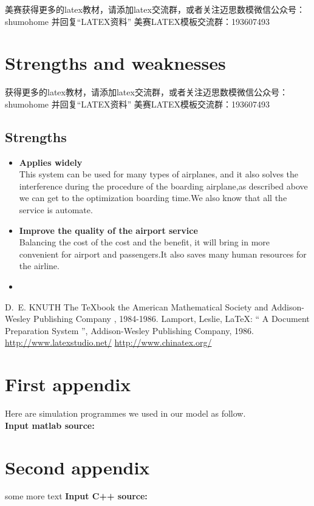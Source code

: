 \documentclass{mcmthesis}
\begin{document}
美赛获得更多的latex教材，请添加latex交流群，或者关注迈思数模微信公众号：shumohome
并回复“LATEX资料”
美赛LATEX模板交流群：193607493
\section{Strengths and weaknesses}

获得更多的latex教材，请添加latex交流群，或者关注迈思数模微信公众号：shumohome
并回复“LATEX资料”
美赛LATEX模板交流群：193607493

\subsection{Strengths}
\begin{itemize}
\item \textbf{Applies widely}\\
This  system can be used for many types of airplanes, and it also
solves the interference during  the procedure of the boarding
airplane,as described above we can get to the  optimization
boarding time.We also know that all the service is automate.
\item \textbf{Improve the quality of the airport service}\\
Balancing the cost of the cost and the benefit, it will bring in
more convenient  for airport and passengers.It also saves many
human resources for the airline. \item \textbf{}
\end{itemize}

\begin{thebibliography}{99}
 D.~E. KNUTH   The \TeX{}book  the American
Mathematical Society and Addison-Wesley
Publishing Company , 1984-1986.
Lamport, Leslie,  \LaTeX{}: `` A Document Preparation System '',
Addison-Wesley Publishing Company, 1986.
\url{http://www.latexstudio.net/}
\url{http://www.chinatex.org/}
\end{thebibliography}

\begin{appendices}

\section{First appendix}



Here are simulation programmes we used in our model as follow.\\

\textbf{\textcolor[rgb]{0.98,0.00,0.00}{Input matlab source:}}


\section{Second appendix}

some more text \textcolor[rgb]{0.98,0.00,0.00}{\textbf{Input C++ source:}}


\end{appendices}
\end{document}
